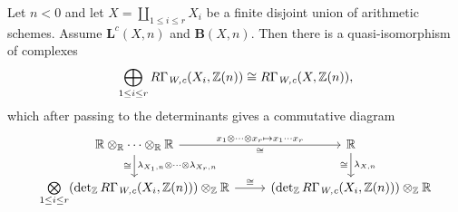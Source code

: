 \documentclass{article}
\numberwithin{equation}{section}
\begin{document}
\begin{lemma}
  \label{lemma:lambda-and-disjoint-unions}
  Let $n < 0$ and let $X = \coprod_{1 \le i \le r} X_i$ be a finite disjoint
  union of arithmetic schemes. Assume $\mathbf{L}^c (X,n)$ and
  $\mathbf{B} (X,n)$. Then there is a quasi-isomorphism of complexes
  \[ \bigoplus_{1 \le i \le r} R\Gamma_{\text{\it W,c}} (X_i, \mathbb{Z}(n)) \cong
    R\Gamma_{\text{\it W,c}} (X, \mathbb{Z}(n)), \]
  which after passing to the determinants gives a commutative diagram
  \begin{equation}
    \label{eqn:lambda-and-disjoint-unions}
    \begin{tikzcd}
      \RR \otimes_\RR \cdots \otimes_\RR \RR\ar{d}{\lambda_{X_1,n}\otimes\cdots\otimes\lambda_{X_r,n}}[swap]{\cong} \ar{r}{x_1\otimes\cdots\otimes x_r \mapsto x_1\cdots x_r}[swap]{\cong} & \RR \ar{d}{\lambda_{X,n}}[swap]{\cong} \\
      \bigotimes\limits_{1 \le i \le r} (\det_\ZZ R\Gamma_\Wc (X_i, \ZZ(n))) \otimes_\ZZ \RR \ar{r}{\cong} & (\det_\ZZ R\Gamma_\Wc (X_i, \ZZ(n))) \otimes_\ZZ \RR
    \end{tikzcd}
  \end{equation}


\end{lemma}
\end{document}
